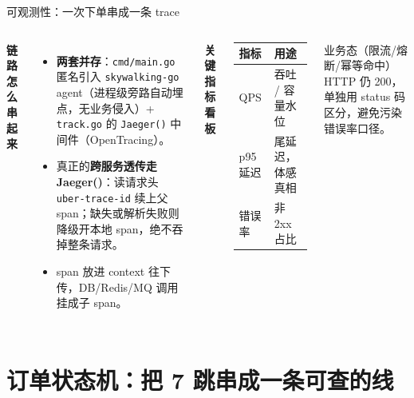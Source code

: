 \documentclass[aspectratio=169,11pt]{beamer}
\begin{document}
\begin{frame}[shrink]{可观测性：一次下单串成一条 trace}
  \begin{columns}[T]
      \textbf{链路怎么串起来}
      \begin{itemize}\small
        \item \textbf{两套并存}：\texttt{cmd/main.go} 匿名引入 \texttt{skywalking-go} agent（进程级旁路自动埋点，无业务侵入）+ \texttt{track.go} 的 \texttt{Jaeger()} 中间件（OpenTracing）。
        \item 真正的\textbf{跨服务透传走 Jaeger()}：读请求头 \texttt{uber-trace-id} 续上父 span；缺失或解析失败则降级开本地 span，绝不吞掉整条请求。
        \item span 放进 context 往下传，DB/Redis/MQ 调用挂成子 span。
      \end{itemize}
      \textbf{关键指标看板}
      \begin{table}\small
      \begin{tabular}{@{}ll@{}}
        \toprule
        指标 & 用途 \\
        \midrule
        QPS & 吞吐 / 容量水位 \\
        p95 延迟 & 尾延迟，体感真相 \\
        错误率 & 非 2xx 占比 \\
        \bottomrule
      \end{tabular}
      \end{table}
      \vspace{1mm}
      业务态（限流/熔断/幂等命中）HTTP 仍 200，单独用 status 码区分，避免污染错误率口径。
  \end{columns}
  \vspace{1mm}
\end{frame}

\section{订单状态机：把 7 跳串成一条可查的线}
\end{document}
